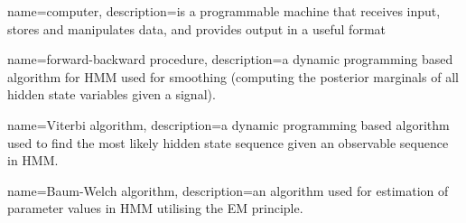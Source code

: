 %
%
%
{
	name=computer,
	description={is a programmable machine that receives input,
		stores and manipulates data, and provides
		output in a useful format}
}

{
	name={forward-backward procedure},
	description={a dynamic programming based algorithm for HMM used for smoothing (computing the posterior marginals of all hidden state variables given a signal).}
}

{
	name={Viterbi algorithm},
	description={a dynamic programming based algorithm used to find the most likely hidden state sequence given an observable sequence in HMM.}
}
	
{
	name={Baum-Welch algorithm},
	description={an algorithm used for estimation of parameter values in HMM utilising the EM principle.}
}
%
%
%
%
%


%
%
%
